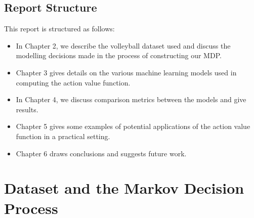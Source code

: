 \documentclass{sfuthesis}
\begin{document}
	\section{Report Structure}
	This report is structured as follows:
	\begin{itemize}
		\item In Chapter 2, we describe the volleyball dataset used and discuss the modelling decisions made in the process of constructing our MDP.
		\item Chapter 3 gives details on the various machine learning models used in computing the action value function.
		\item In Chapter 4, we discuss comparison metrics between the models and give results.
		\item Chapter 5 gives some examples of potential applications of the action value function in a practical setting.
		\item Chapter 6 draws conclusions and suggests future work.
	\end{itemize}
	
	\chapter{Dataset and the Markov Decision Process}
	
\end{document}
